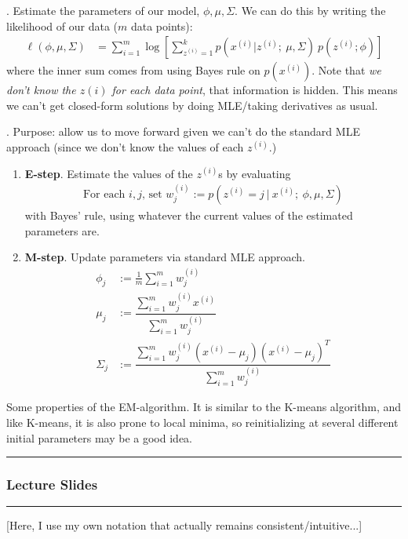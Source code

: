 \documentclass[12pt]{article}
\begin{document}
\myspace
\p {}. Estimate the parameters of our model, $\phi, \mu, \Sigma$. We can do this by writing the likelihood of our data ($m$ data points):
\begin{align}
\ell(\phi, \mu, \Sigma) &= \sum_{i = 1}^{m} \log\left[
	\sum_{z^{(i)} = 1}^k p\left( x^{(i)} | z^{(i)} ; ~ \mu, \Sigma\right)~p(z^{(i)}; \phi)
 \right]
\end{align}
where the inner sum comes from using Bayes rule on $p(x^{(i)})$. Note that \textit{we don't know the $z{(i)}$ for each data point}, that information is hidden. This means we can't get closed-form solutions by doing MLE/taking derivatives as usual.

\myspace
\p {}. Purpose: allow us to move forward given we can't do the standard MLE approach (since we don't know the values of each $z^{(i)}$.)
\begin{enumerate}
	\item \textbf{E-step}. Estimate the values of the $z^{(i)}$s by evaluating
	\begin{align}
		\text{For each $i, j$, set } w_j^{(i)} := p(z^{(i)} = j~|~ x^{(i)}; ~ \phi,\mu,\Sigma)
	\end{align}
	with Bayes' rule, using whatever the current values of the estimated parameters are. 
	
	\item \textbf{M-step}. Update parameters via standard MLE approach. 
	\begin{align}
	\phi_j &:= \frac{1}{m} \sum_{i = 1}^m w_j^{(i)} \\
	\mu_j &:= \dfrac{ \sum_{i = 1}^m w_j^{(i)} x^{(i)} }{ \sum_{i = 1}^m w_j^{(i)}  } \\
	\Sigma_j &:= \dfrac{ \sum_{i = 1}^m w_j^{(i)}(x^{(i)} - \mu_j) (x^{(i)} - \mu_j)^T }{ \sum_{i = 1}^m w_j^{(i)}  } 
	\end{align}
\end{enumerate}

Some properties of the EM-algorithm. It is similar to the K-means algorithm, and like K-means, it is also prone to local minima, so reinitializing at several different initial parameters may be a good idea. 




\hrule
\subsubsection{Lecture Slides}
\hrule
[Here, I use my own notation that actually remains consistent/intuitive...]
\end{document}
